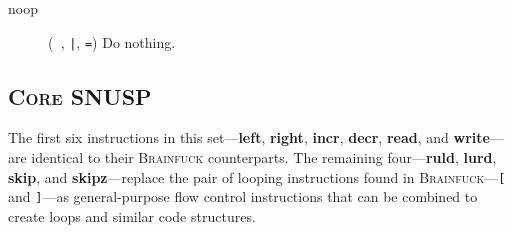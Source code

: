 \documentclass[a4paper]{article}
\begin{document}
\begin{description}

\item[noop] (\verb" ", \verb"|", \verb"=") Do nothing.

\end{description}



\subsection{\textsc{Core SNUSP}}

The first six instructions in this set---\textbf{left}, \textbf{right},
\textbf{incr}, \textbf{decr}, \textbf{read}, and \textbf{write}---are
identical to their \textsc{Brainfuck} counterparts.  The remaining
four---\textbf{ruld}, \textbf{lurd}, \textbf{skip}, and
\textbf{skipz}---replace the pair of looping instructions found in
\textsc{Brainfuck}---\verb"[" and \verb"]"---as general-purpose flow control
instructions that can be combined to create loops and similar code structures.
\end{document}
